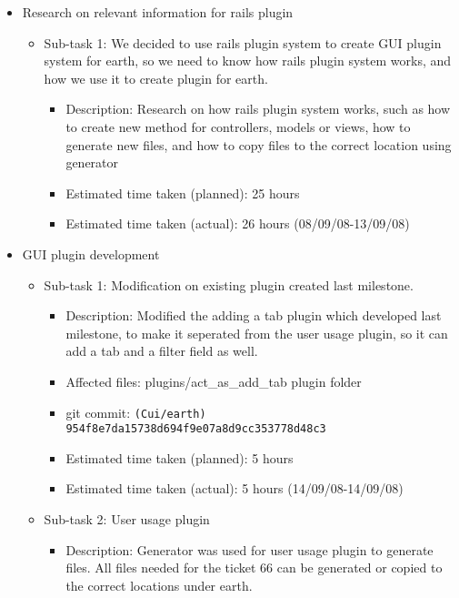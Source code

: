 \documentclass{article}
\begin{document}
\begin{itemize}
    \item Research on relevant information for rails plugin
        \begin{itemize}
            \item Sub-task 1: We decided to use rails plugin system to create GUI plugin system for earth, so we need to know how rails plugin system works, and how we use it to create plugin for earth.
                \begin{itemize}
                    \item Description: Research on how rails plugin system works, such as how to create new method for controllers, models or views, how to generate new files, and how to copy files to the correct location using generator
                    \item Estimated time taken (planned): 25 hours
                    \item Estimated time taken (actual):  26 hours (08/09/08-13/09/08)
                \end{itemize}
        \end{itemize}
    \item GUI plugin development
        \begin{itemize}
            \item Sub-task 1: Modification on existing plugin created last milestone.
                \begin{itemize}
                    \item Description: Modified the adding a tab plugin which developed last milestone, to make it seperated from the user usage plugin, so it can add a tab and a filter field as well.
                    \item Affected files: plugins/act\_as\_add\_tab plugin folder
                    \item git commit: \texttt{(Cui/earth) 954f8e7da15738d694f9e07a8d9cc353778d48c3}
                    \item Estimated time taken (planned): 5 hours
                    \item Estimated time taken (actual): 5 hours (14/09/08-14/09/08)
                \end{itemize}
            \item Sub-task 2: User usage plugin
                \begin{itemize}
                    \item Description: Generator was used for user usage plugin to generate files. All files needed for the ticket 66 can be generated or copied to the correct locations under earth.

\end{itemize}
\end{itemize}
\end{itemize}
\end{document}
